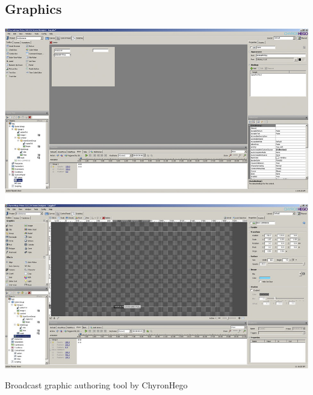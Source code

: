 \documentclass[sigchi-a, authorversion]{acmart}
\begin{document}

\subsection{Graphics}

\begin{marginfigure}
    \vspace{-17pc}
    \includegraphics[width=\marginparwidth]{Figures/ChyronHegotool.jpg}
    \caption{Broadcast graphic authoring tool by ChyronHego}
    \label{fig:chyronhego}
\end{marginfigure}
\end{document}
